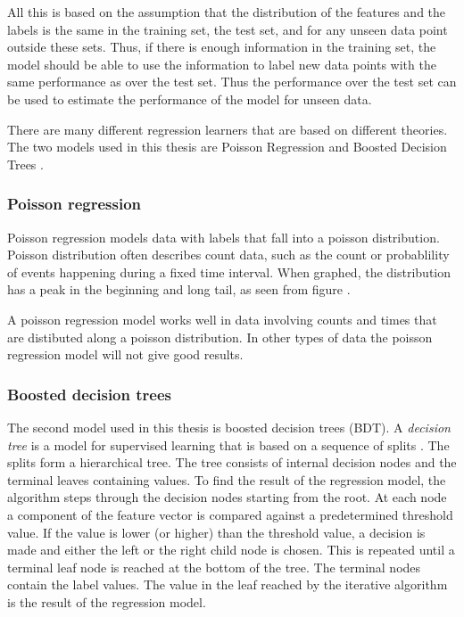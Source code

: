 All this is based on the assumption that the distribution of the features and the labels is the same in the training set, the test set, and for any unseen data point outside these sets. 
Thus, if there is enough information in the training set, the model should be able to use the information to label new data points with the same performance as over the test set.
Thus the performance over the test set can be used to estimate the performance of the model for unseen data.

There are many different regression learners that are based on different theories. The two models used in this thesis are Poisson Regression  and Boosted Decision Trees .

\subsubsection{Poisson regression}

Poisson regression models data with labels that fall into a poisson distribution.
Poisson distribution often describes count data, such as the count or probablility of events happening during a fixed time interval. 
When graphed, the distribution has a peak in the beginning and long tail, as seen from figure .



A poisson regression model works well in data involving counts and times that are distibuted along a poisson distribution. 
In other types of data the poisson regression model will not give good results.

\subsubsection{Boosted decision trees}

The second model used in this thesis is boosted decision trees (BDT).
A \textit{decision tree} is a model for supervised learning that is based on a sequence of splits \cite{alpaydin}.
The splits form a hierarchical tree.
The tree consists of internal decision nodes and the terminal leaves containing values.
To find the result of the regression model, the algorithm steps through the decision nodes starting from the root.
At each node a component of the feature vector is compared against a predetermined threshold value.
If the value is lower (or higher) than the threshold value, a decision is made and either the left or the right child node is chosen.
This is repeated until a terminal leaf node is reached at the bottom of the tree. 
The terminal nodes contain the label values.
The value in the leaf reached by the iterative algorithm is the result of the regression model.

